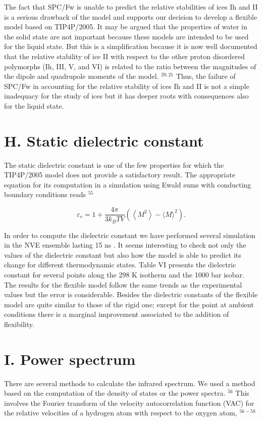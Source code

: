 \documentclass[10pt]{article}
\begin{document}
The fact that SPC/Fw is unable to predict the relative stabilities of ices Ih and II is a serious drawback of the model and supports our decision to develop a flexible model based on TIP4P/2005. It may be argued that the properties of water in the solid state are not important because these models are intended to be used for the liquid state. But this is a simplification because it is now well documented that the relative stability of ice II with respect to the other proton disordered polymorphs (Ih, III, V, and VI) is related to the ratio between the magnitudes of the dipole and quadrupole moments of the model. ${ }^{20,21}$ Thus, the failure of SPC/Fw in accounting for the relative stability of ices Ih and II is not a simple inadequacy for the study of ices but it has deeper roots with consequences also for the liquid state.

\section*{H. Static dielectric constant}
The static dielectric constant is one of the few properties for which the TIP4P/2005 model does not provide a satisfactory result. The appropriate equation for its computation in a simulation using Ewald sums with conducting boundary conditions reads ${ }^{55}$


\begin{equation*}
\varepsilon_{r}=1+\frac{4 \pi}{3 k_{B} T V}\left(\left\langle M^{2}\right\rangle-\langle M\rangle^{2}\right) . \tag{9}
\end{equation*}


In order to compute the dielectric constant we have performed several simulation in the NVE ensemble lasting 15 ns . It seems interesting to check not only the values of the dielectric constant but also how the model is able to predict its change for different thermodynamic states. Table VI presents the dielectric constant for several points along the 298 K isotherm and the 1000 bar isobar. The results for the flexible model follow the same trends as the experimental values but the error is considerable. Besides the dielectric constants of the flexible model are quite similar to those of the rigid one; except for the point at ambient conditions there is a marginal improvement associated to the addition of flexibility.

\section*{I. Power spectrum}
There are several methods to calculate the infrared spectrum. We used a method based on the computation of the density of states or the power spectra. ${ }^{56}$ This involves the Fourier transform of the velocity autocorrelation function (VAC) for the relative velocities of a hydrogen atom with respect to the oxygen atom, ${ }^{56-58}$
\end{document}
